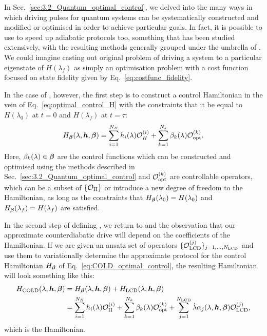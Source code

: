 In Sec.~\ref{sec:3.2_Quantum_optimal_control}, we delved into the many ways in which driving pulses for quantum systems can be systematically constructed and modified or optimised in order to achieve particular goals. In fact, it is possible to use  to speed up adiabatic protocols too, something that has been studied extensively, with the resulting methods generally grouped under the umbrella of  \cite{guery-odelin_shortcuts_2019, torrontegui_chapter_2013}. We could imagine casting out original problem of driving a system to a particular eigenstate of $H(\lambda_f)$ as simply an optimisation problem with a cost function focused on state fidelity given by Eq.~\eqref{eq:costfunc_fidelity}. 

In the case of , however, the first step is to construct a control Hamiltonian in the vein of Eq.~\eqref{eq:optimal_control_H} with the constraints that it be equal to $H(\lambda_0)$ at $t=0$ and $H(\lambda_f)$ at $t=\tau$:
\begin{equation}\label{eq:COLD_optimal_control}
    H_{\boldsymbol{\beta}}(\lambda, \boldsymbol{h}, \boldsymbol{\beta}) = \sum_{i = 1}^{N_H} h_i(\lambda) \mathcal{O}_H^{(i)} + \sum_{k = 1}^{N_k} \beta_k(\lambda) \mathcal{O}_{\rm opt}^{(k)}.
\end{equation}
Here, $\beta_k(\lambda) \in \boldsymbol{\beta}$ are the control functions which can be constructed and optimised using the methods described in Sec.~\ref{sec:3.2_Quantum_optimal_control} and $\mathcal{O}_{\rm opt}^{(k)}$ are controllable operators, which can be a subset of $\{\mathcal{O}_{\rm H}\}$ or introduce a new degree of freedom to the Hamiltonian, as long as the constraints that $H_{\boldsymbol{\beta}}(\lambda_0) = H(\lambda_0)$ and $H_{\boldsymbol{\beta}}(\lambda_f) = H(\lambda_f)$ are satisfied. 

In the second step of defining , we return to  and the observation that our approximate counterdiabatic drive will depend on the coefficients of the Hamiltonian. If we are given an ansatz set of operators $\{\mathcal{O}_{\rm LCD}^{(j)}\}_{j = 1, ..., N_{\rm LCD}}$ and use them to variationally determine the approximate  protocol for the control Hamiltonian $H_{\boldsymbol{\beta}}$ of Eq.~\eqref{eq:COLD_optimal_control}, the resulting Hamiltonian will look something like this:
\begin{equation}\label{eq:COLD_Hamiltonian}
    \begin{aligned}
        H_{\rm COLD}(\lambda, \boldsymbol{h}, \boldsymbol{\beta}) &= H_{\boldsymbol{\beta}}(\lambda, \boldsymbol{h}, \boldsymbol{\beta}) + H_{\rm LCD}(\lambda, \boldsymbol{h}, \boldsymbol{\beta}) \\
        &= \sum_{i = 1}^{N_H} h_i(\lambda) \mathcal{O}_{\rm H}^{(i)} + \sum_{k = 1}^{N_k} \beta_k(\lambda) \mathcal{O}_{\rm opt}^{(k)} + \sum_{j = 1}^{N_{\rm LCD}} \dot{\lambda} \alpha_{j}(\lambda, \boldsymbol{h}, \boldsymbol{\beta}) \mathcal{O}_{\rm LCD}^{(j)},
    \end{aligned}
\end{equation}
which is the  Hamiltonian. 

